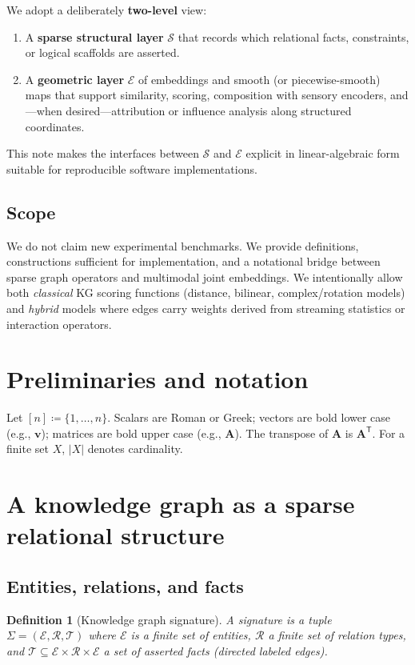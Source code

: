 \documentclass[11pt]{article}
\newtheorem{definition}{Definition}
\begin{document}
We adopt a deliberately \textbf{two-level} view:
\begin{enumerate}
  \item A \textbf{sparse structural layer} $\mathcal{S}$ that records which relational facts, constraints, or logical scaffolds are asserted.
  \item A \textbf{geometric layer} $\mathcal{E}$ of embeddings and smooth (or piecewise-smooth) maps that support similarity, scoring, composition with sensory encoders, and---when desired---attribution or influence analysis along structured coordinates.
\end{enumerate}
This note makes the interfaces between $\mathcal{S}$ and $\mathcal{E}$ explicit in linear-algebraic form suitable for reproducible software implementations.

\subsection*{Scope}
We do not claim new experimental benchmarks.
We provide definitions, constructions sufficient for implementation, and a notational bridge between sparse graph operators and multimodal joint embeddings.
We intentionally allow both \emph{classical} KG scoring functions (distance, bilinear, complex/rotation models) and \emph{hybrid} models where edges carry weights derived from streaming statistics or interaction operators.

\section{Preliminaries and notation}
Let $[n] \coloneqq \{1,\ldots,n\}$.
Scalars are Roman or Greek; vectors are bold lower case (e.g., $\bm{v}$); matrices are bold upper case (e.g., $\bm{A}$).
The transpose of $\bm{A}$ is $\bm{A}^{\mathsf{T}}$.
For a finite set $X$, $|X|$ denotes cardinality.

\section{A knowledge graph as a sparse relational structure}

\subsection{Entities, relations, and facts}
\begin{definition}[Knowledge graph signature]
A \emph{signature} is a tuple $\Sigma = (\mathcal{E}, \mathcal{R}, \mathcal{T})$ where $\mathcal{E}$ is a finite set of \emph{entities}, $\mathcal{R}$ a finite set of \emph{relation types}, and $\mathcal{T} \subseteq \mathcal{E} \times \mathcal{R} \times \mathcal{E}$ a set of \emph{asserted facts} (directed labeled edges).
\end{definition}
\end{document}
